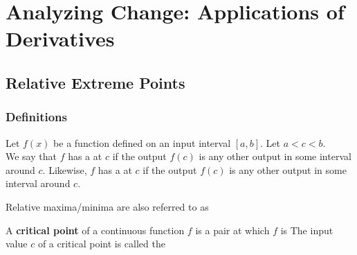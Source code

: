 \documentclass[notes]{subfiles}
\begin{document}
	\chapter{Analyzing Change: Applications of Derivatives}
	\setcounter{section}{2}
	\fancyhead[LO,RE]{\bfseries  \currentname}
	\fancyfoot[C]{{}}
	\fancyfoot[RO,LE]{\large \thepage}	%


\section*{Relative Extreme Points}\label{cs42}
	\subsection*{Definitions}
		\begin{defn}
			Let $f(x)$ be a function defined on an input interval $[a,b]$.  Let $a < c < b$.\\[15pt] 
			We say that $f$ has a  at $c$ if the output $f(c)$ is  any other output in some interval around $c$.  Likewise, $f$ has a  at $c$ if\fitb{}{\\[15pt]} the output $f(c)$ is  any other output in some interval around $c$.
		\end{defn}
					
Relative maxima/minima are also referred to as 
			
		\begin{defn}
			A \textbf{critical point} of a continuous function $f$ is a pair at which $f$ is  The input value $c$ of a  critical point is called the 
		\end{defn}
			\newpage
			
\end{document}
